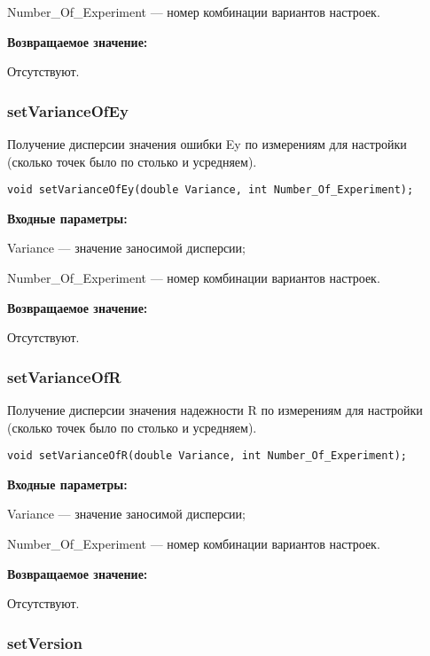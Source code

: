 \documentclass[a4paper,12pt]{article}
\begin{document}
    Number\_Of\_Experiment --- номер комбинации вариантов настроек.

\textbf{Возвращаемое значение:}

Отсутствуют.


\subsubsection{setVarianceOfEy}\label{setVarianceOfEy}

Получение дисперсии значения ошибки Ey по измерениям для настройки (сколько точек было по столько и усредняем).


\begin{lstlisting}[label=code_syntax_setVarianceOfEy,caption=Синтаксис]
void setVarianceOfEy(double Variance, int Number_Of_Experiment);
\end{lstlisting}

\textbf{Входные параметры:}

	 Variance --- значение заносимой дисперсии;
 
    Number\_Of\_Experiment --- номер комбинации вариантов настроек.

\textbf{Возвращаемое значение:}

Отсутствуют.


\subsubsection{setVarianceOfR}\label{setVarianceOfR}

Получение дисперсии значения надежности R по измерениям для настройки (сколько точек было по столько и усредняем).


\begin{lstlisting}[label=code_syntax_setVarianceOfR,caption=Синтаксис]
void setVarianceOfR(double Variance, int Number_Of_Experiment);
\end{lstlisting}

\textbf{Входные параметры:}

	 Variance --- значение заносимой дисперсии;
 
    Number\_Of\_Experiment --- номер комбинации вариантов настроек.

\textbf{Возвращаемое значение:}

Отсутствуют.


\subsubsection{setVersion}\label{setVersion}
\end{document}

